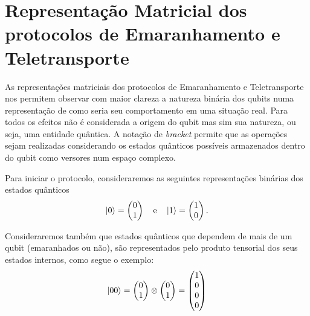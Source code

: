 
\chapter{Representação Matricial dos protocolos de Emaranhamento e Teletransporte}

As representações matriciais dos protocolos de Emaranhamento e Teletransporte nos permitem observar com maior clareza a natureza binária dos qubits numa representação de como seria seu comportamento em uma situação real. Para todos os efeitos não é considerada a origem do qubit mas sim sua natureza, ou seja, uma entidade quântica. A notação de \textit{bracket} permite que as operações sejam realizadas considerando os estados quânticos possíveis armazenados dentro do qubit como versores num espaço complexo.

Para iniciar o protocolo, consideraremos as seguintes representações binárias dos estados quânticos
\begin{equation} \label{01}
\ket{0} = \begin{pmatrix}
0 \\
1
\end{pmatrix} \quad \text{e} \quad
\ket{1} = \begin{pmatrix}
1 \\
0
\end{pmatrix}.
\end{equation}

Consideraremos também que estados quânticos que dependem de mais de um qubit (emaranhados ou não), são representados pelo produto tensorial dos seus estados internos, como segue o exemplo:
\begin{equation}\label{00}
\ket{00} = \begin{pmatrix}
0 \\
1
\end{pmatrix} \otimes \begin{pmatrix}
0 \\
1
\end{pmatrix} = \begin{pmatrix}
1 \\
0 \\
0 \\
0
\end{pmatrix}
\end{equation}

